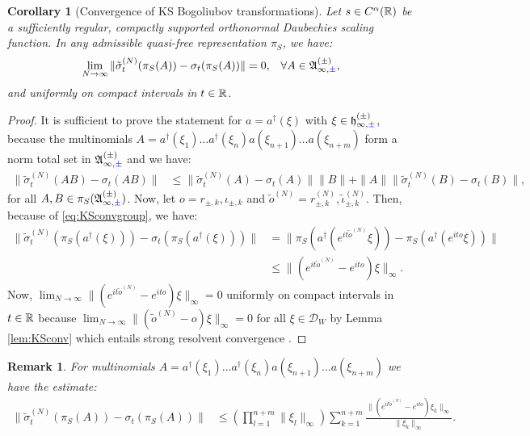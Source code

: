 \documentclass[a4paper, 11pt]{article}
\newcommand{\fA}{\mathfrak{A}}\newcommand{\cA}{\mathcal{A}}\newcommand{\dA}{\mathds{A}}\newcommand{\sA}{\mathscr{A}}
\newcommand{\fh}{\mathfrak{h}}
\DeclareMathOperator{\1}{\mathds{1}}
\newtheorem{cor}[thm]{Corollary}
\newtheorem{rem}[thm]{Remark}
\begin{document}
\begin{cor}[Convergence of KS Bogoliubov transformations]
\label{cor:KSconvbog}
Let $s\in C^{\alpha}(\mathbb{R})$ be a sufficiently regular, compactly supported orthonormal Daubechies scaling function. In any admissible quasi-free representation $\pi_{S}$, we have:
\begin{align*}
\lim_{N\rightarrow\infty}\|\tilde{\sigma}^{(N)}_{t}(\pi_{S}(A)) - \sigma_{t}(\pi_{S}(A))\| & = 0, & \forall A\in\fA^{(\pm)}_{\infty,{\color{blue}\pm}},
\end{align*}
and uniformly on compact intervals in $t\in\mathbb{R}$.
\end{cor}
\begin{proof}
It is sufficient to prove the statement for $a = a^{\dagger}(\xi)$ with $\xi\in\fh^{(\pm)}_{\infty,{\color{blue}\pm}}$, because the multinomials $A = a^{\dagger}(\xi_{1})\dots a^{\dagger}(\xi_{n})a(\xi_{n+1})\dots a(\xi_{n+m})$ form a norm total set in $\fA^{(\pm)}_{\infty,{\color{blue}\pm}}$ and we have:
\begin{align*}
\|\tilde{\sigma}^{(N)}_{t}(AB) - \sigma_{t}(AB)\| & \leq \|\tilde{\sigma}^{(N)}_{t}(A)-\sigma_{t}(A)\|\|B\| +\|A\|\|\tilde{\sigma}^{(N)}_{t}(B)-\sigma_{t}(B)\|,
\end{align*}
for all $A,B\in\pi_{S}(\fA^{(\pm)}_{\infty,{\color{blue}\pm}})$. Now, let $o = r_{\pm,k}, \iota_{\pm,k}$ and $\tilde{o}^{(N)} = r^{(N)}_{\pm,k}, \tilde{\iota}^{(N)}_{\pm,k}$. Then, because of \eqref{eq:KSconvgroup}, we have:
\begin{align*}
\|\tilde{\sigma}^{(N)}_{t}(\pi_{S}(a^{\dagger}(\xi))) - \sigma_{t}(\pi_{S}(a^{\dagger}(\xi)))\| & = \|\pi_{S}(a^{\dagger}(e^{it \tilde{o}^{(N)}}\xi)) - \pi_{S}(a^{\dagger}(e^{ito}\xi))\|\\
& \leq \|(e^{it \tilde{o}^{(N)}} - e^{it o})\xi\|_{\infty}.
\end{align*}
Now, $\lim_{N\rightarrow\infty}\|(e^{it \tilde{o}^{(N)}} - e^{it o})\xi\|_{\infty} = 0$ uniformly on compact intervals in $t\in\mathbb{R}$ because $\lim_{N\rightarrow\infty}\|(\tilde{o}^{(N)} - o)\xi\|_{\infty} = 0$ for all $\xi\in\mathcal{D}_{W}$ by Lemma \ref{lem:KSconv} which entails strong resolvent convergence \cite{ReedMethodsOfModern1}.
\end{proof}

\begin{rem}
\label{rem:KSunitaryconv}
For multinomials $A = a^{\dagger}(\xi_{1})\dots a^{\dagger}(\xi_{n})a(\xi_{n+1})\dots a(\xi_{n+m})$ we have the estimate:
\begin{align}
\label{eq:KSmultiestimate}
\|\tilde{\sigma}^{(N)}_{t}(\pi_{S}(A)) - \sigma_{t}(\pi_{S}(A))\| & \leq \left(\prod_{l=1}^{n+m}\|\xi_{l}\|_{\infty}\right)\sum_{k=1}^{n+m}\frac{\|(e^{it \tilde{o}^{(N)}} - e^{it o})\xi_{k}\|_{\infty}}{\|\xi_{k}\|_{\infty}}.
\end{align}
\end{rem}
\end{document}

